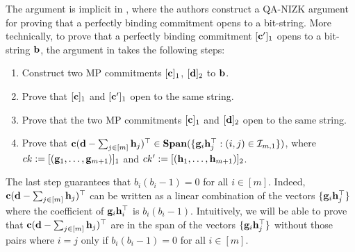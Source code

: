 The argument is implicit in \cite{AC:GonHevRaf15}, where the authors construct a QA-NIZK argument for proving that a perfectly binding commitment opens to a bit-string. More technically, to prove that a  perfectly binding commitment $[\mathbf{c}']_1$ opens to a bit-string $\mathbf{b}$, the argument in \cite{AC:GonHevRaf15} takes the following steps:
\begin{enumerate}
\item Construct two MP commitments $[\mathbf{c}]_1$, 
$[\mathbf{d}]_2$ to $\mathbf{b}$. 
\item Prove that $[\mathbf{c}]_1$ and $[\mathbf{c}']_1$ open to the same string. 
\item Prove that the two MP commitments $[\mathbf{c}]_1$ and $[\mathbf{d}]_2$ open to the same string.
\item Prove that $\mathbf{c}(\mathbf{d}-\sum_{j \in [m]}
\mathbf{h}_j)^\top\in\mathbf{Span}(\{\mathbf{g}_i\mathbf{h}_j^\top:(i,j)\in\mathcal{I}_{m,1}\})$, where $ck:=[(\mathbf{g}_1,\ldots,\mathbf{g}_{m+1})]_1$ and $ck':=[(\mathbf{h}_1,\ldots,\mathbf{h}_{m+1})]_2$.
\end{enumerate}
The last step guarantees that 
$b_i(b_i-1)=0$ for all $i \in [m]$. Indeed, 
$\mathbf{c}(\mathbf{d}-\sum_{j \in [m]}
\mathbf{h}_j)^\top$ can be written as a linear combination of the vectors $\{\mathbf{g}_i\mathbf{h}_j^\top\}$ where the coefficient of $\mathbf{g}_i\mathbf{h}_i^{\top}$ is $b_i(b_i-1)$. Intuitively, we will be able to prove that $\mathbf{c}(\mathbf{d}-\sum_{j \in [m]}
\mathbf{h}_j)^\top$ are in the span of the vectors  $\{\mathbf{g}_i\mathbf{h}_j^\top\}$ without those pairs where $i=j$ only if $b_i(b_i-1)=0$ for all $i \in [m]$. 


  











          
